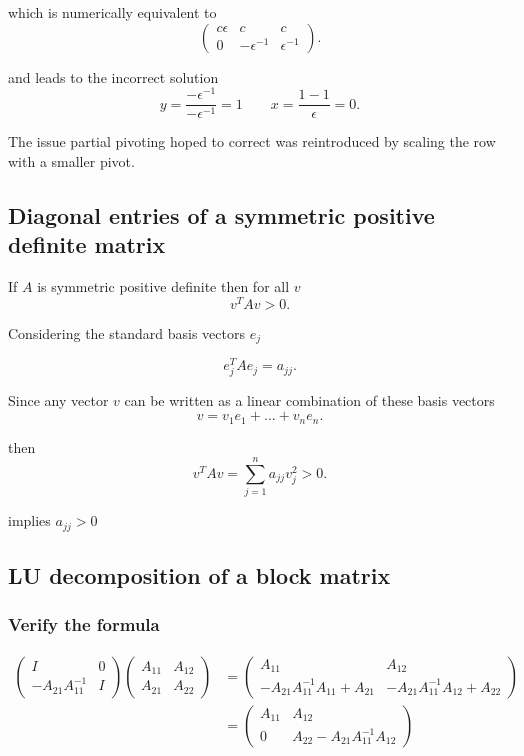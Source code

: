 which is numerically equivalent to
\[
\begin{pmatrix}
  c \epsilon & c & c \\
  0 & -\epsilon ^{-1} & \epsilon ^{-1}
\end{pmatrix}
.\] 

and leads to the incorrect solution
\[
  y = \frac{-\epsilon ^{-1}}{-\epsilon ^{-1}} = 1 \qquad
  x = \frac{1-1}{\epsilon } = 0
.\] 

The issue partial pivoting hoped to correct was reintroduced by scaling the row
with a smaller pivot. 

\subsection{Diagonal entries of a symmetric positive definite matrix}%
\label{sub:diagonal_entries_of_a_symmetric_positive_definite_matrix}

If $A$ is symmetric positive definite then for all $v$
\[
v^{T}Av > 0
.\] 

Considering the standard basis vectors $e_{j}$ 

\[
e_{j}^{T}Ae_{j} = a_{jj}
.\] 

Since any vector $v$ can be written as a linear
combination of these basis vectors
\[
v = v_1e_1 + \dots + v_{n}e_{n}
.\] 

then
\[
  v^{T}Av = \sum^{n}_{j=1} a_{jj}v_{j}^{2} > 0
.\] 

implies $a_{jj} > 0$

\subsection{LU decomposition of a block matrix}%
\label{sub:lu_decomposition_of_a_block_matrix}
\subsubsection{Verify the formula}%
\label{ssub:part_a}

\begin{align*}
  \begin{pmatrix} I & 0 \\ -A_{21}A_{11}^{-1} & I \end{pmatrix} \begin{pmatrix} A_{11} & A_{12} \\ A_{21} & A_{22} \end{pmatrix} &= \begin{pmatrix} A_{11} & A_{12} \\ -A_{21}A_{11}^{-1}A_{11} + A_{21} & -A_{21}A_{11}^{-1}A_{12} + A_{22} \end{pmatrix} \nonumber \\
  &= \begin{pmatrix} A_{11} & A_{12} \\ 0 & A_{22}-A_{21}A_{11}^{-1}A_{12} \end{pmatrix} \\
\end{align*}


